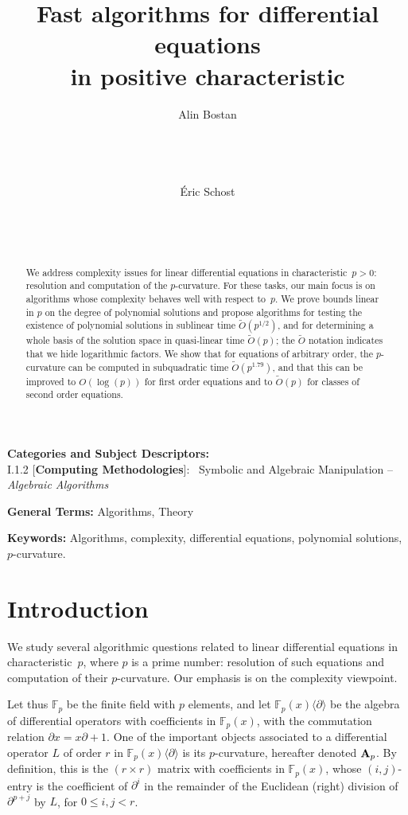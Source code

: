 \documentclass{sig-alternate}
\title{Fast algorithms for differential equations \\ in positive characteristic}
\author{
\alignauthor Alin Bostan\\
\affaddr{Algorithms Project}\\
\affaddr{INRIA Rocquencourt}\\ 
\affaddr{France}\\
\affaddr{78153 Le Chesnay Cedex France}\\
\alignauthor \'Eric Schost\\
\affaddr{ORCCA and Computer Science Department}\\
\affaddr{The University of Western Ontario}\\
\affaddr{London, ON, Canada}\\
\affaddr{eschost@uwo.ca} 
}
\def\F {\mathbb{F}}
\def\mA {\ensuremath{{\bf A}}}
\begin{document}
\maketitle
\begin{abstract} 
We address complexity issues for linear differential equations in characteristic~$p>0$: resolution and computation of the $p$-curvature. For these tasks, our main focus is on algorithms whose complexity behaves well with respect to~$p$. We prove bounds linear in $p$ on the degree of polynomial solutions and propose algorithms for testing the existence of polynomial solutions in sublinear time $\tilde{O}(p^{1/2})$, and for determining a whole basis of the solution space in quasi-linear time $\tilde{O}(p)$; the $\tilde{O}$ notation indicates that we hide logarithmic factors. We show that for equations of arbitrary order, the $p$-curvature can be computed in subquadratic time $\tilde{O}(p^{1.79})$, and that this can be improved to $O(\log(p))$ for first order equations and to $\tilde{O}(p)$ for classes of second order equations.  
\end{abstract}



\vspace{1mm}
 \noindent
 {\bf Categories and Subject Descriptors:} \\
\noindent I.1.2 [{\bf Computing Methodologies}]:{~} Symbolic and Algebraic
  Manipulation -- \emph{Algebraic Algorithms}
 
 \vspace{1mm}
 \noindent
 {\bf General Terms:} Algorithms, Theory
 
 \vspace{1mm}
 \noindent
 {\bf Keywords:} Algorithms, complexity, differential equations, polynomial solutions, $p$-curvature.



\medskip

\section{Introduction}\label{sec:intro}

\noindent We study several algorithmic questions related to linear
differential equations in characteristic~$p$, where $p$ is a prime
number: resolution of such equations and computation of their
$p$-curvature. Our emphasis is on the complexity viewpoint.

Let thus $\F_p$ be the finite field with $p$ elements, and let $\F_p(x)\langle
\partial \rangle$ be the algebra of differential operators with
coefficients in $\F_p(x)$, with the commutation relation $\partial x =
x\partial + 1$. One of the important objects associated to a
differential operator $L$ of order $r$ in $\F_p(x)\langle \partial
\rangle$ is its $p$-curvature, hereafter denoted $\mA_p$. By
definition, this is the $(r\times r)$ matrix with coefficients in
$\F_p(x)$, whose $(i,j)$-entry is the coefficient of $\partial^{i}$ in
the remainder of the Euclidean (right) division of $\partial^{p+j}$ by
$L$, for $0 \le i,j < r$.
\end{document}
